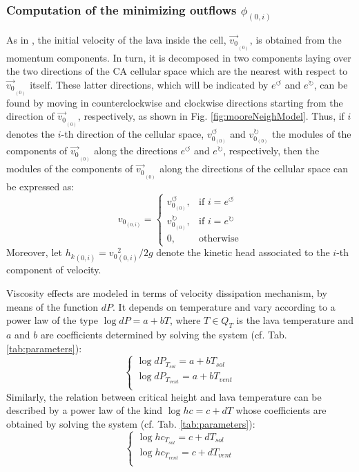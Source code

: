 \subsubsection{Computation of the minimizing outflows $\phi_{(0,i)}$}\label{sec:min-ouflows}
As in \cite{xxx, xxx}, the initial velocity of the lava inside the cell,
$\overrightarrow{v_{0}}_{_{(0)}}$, is obtained from the momentum components. In
turn, it is decomposed in two components laying over the two directions of the
CA cellular space which are the nearest with respect to
$\overrightarrow{v_{0}}_{_{(0)}}$ itself. These latter directions, which will be
indicated by $e^\circlearrowleft$ and $e^\circlearrowright$, can be found by
moving in counterclockwise and clockwise directions starting from the direction
of $\overrightarrow{v_{0}}_{_{(0)}}$, respectively, as shown in Fig.
\ref{fig:mooreNeighModel}. Thus, if $i$ denotes the $i$-th direction of the cellular
space, $v_{0_{(0)}}^\circlearrowleft$ and $v_{0_{(0)}}^\circlearrowright$ the
modules of the components of $\overrightarrow{v_{0}}_{_{(0)}}$ along the
directions $e^\circlearrowleft$ and $e^\circlearrowright$, respectively, then
the modules of the components of $\overrightarrow{v_{0}}_{_{(0)}}$ along the
directions of the cellular space can be expressed as:
$$ v_{0_{(0,i)}}=
	\begin{cases}
		v_{0_{(0)}}^\circlearrowleft, & \mbox{if }i = e^\circlearrowleft \\
		v_{0_{(0)}}^\circlearrowright, & \mbox{if }i = e	^\circlearrowright \\
		0, & \mbox{otherwise}
	\end{cases}
$$
Moreover, let ${h_k}_{(0,i)} = {v_0}_{(0,i)}^2/2g$ denote the kinetic head associated to the $i$-th component of velocity.

Viscosity effects are modeled in terms of velocity dissipation mechanism, by means of the function $dP$. It depends on temperature and vary according to a power law of the type $\log dP = a+bT$, where $T \in Q_T$ is the lava temperature and $a$ and $b$ are coefficients determined by solving the system (cf. Tab. \ref{tab:parameters}):
$$
\begin{cases}
	\log dP_{T_{sol}} = a+bT_{sol}\\
	\log dP_{T_{vent}} = a+bT_{vent}\\
\end{cases}
$$
Similarly, the relation between critical height and lava temperature can be described by a power law of the kind $\log hc = c+dT$ whose coefficients are obtained by solving the system (cf. Tab. \ref{tab:parameters}):
$$
\begin{cases}
	\log hc_{T_{sol}} = c+dT_{sol}\\
	\log hc_{T_{vent}} = c+dT_{vent}\\
\end{cases}
$$

